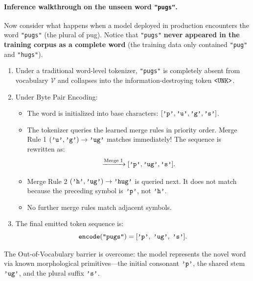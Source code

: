 \documentclass[../../main.tex]{subfiles}
\begin{document}
\paragraph{Inference walkthrough on the unseen word \texttt{"pugs"}.}
Now consider what happens when a model deployed in production encounters the word \texttt{"pugs"} (the plural of pug).
Notice that \texttt{"pugs"} \textbf{never appeared in the training corpus as a complete word} (the training data only contained \texttt{"pug"} and \texttt{"hugs"}).
\begin{enumerate}
    \item Under a traditional word-level tokenizer, \texttt{"pugs"} is completely absent from vocabulary $\mathcal{V}$ and collapses into the information-destroying token $\text{\texttt{<UNK>}}$.
    \item Under Byte Pair Encoding:
    \begin{itemize}
        \item The word is initialized into base characters: $[\text{\texttt{'p'}}, \text{\texttt{'u'}}, \text{\texttt{'g'}}, \text{\texttt{'s'}}]$.
        \item The tokenizer queries the learned merge rules in priority order. Merge Rule 1 $(\text{\texttt{'u'}}, \text{\texttt{'g'}}) \to \text{\texttt{'ug'}}$ matches immediately! The sequence is rewritten as:
        \begin{equation*}
        [\text{\texttt{'p'}}, \text{\texttt{'u'}}, \text{\texttt{'g'}}, \text{\texttt{'s'}}] \xrightarrow{\text{Merge 1}} [\text{\texttt{'p'}}, \text{\texttt{'ug'}}, \text{\texttt{'s'}}].
        \end{equation*}
        \item Merge Rule 2 $(\text{\texttt{'h'}}, \text{\texttt{'ug'}}) \to \text{\texttt{'hug'}}$ is queried next. It does not match because the preceding symbol is $\text{\texttt{'p'}}$, not $\text{\texttt{'h'}}$.
        \item No further merge rules match adjacent symbols.
    \end{itemize}
    \item The final emitted token sequence is:
    \begin{equation}
    \label{eq:bpe_unseen_result}
    \text{\texttt{encode}}(\text{\texttt{"pugs"}}) = [\text{\texttt{'p'}}, \; \text{\texttt{'ug'}}, \; \text{\texttt{'s'}}].
    \end{equation}
\end{enumerate}
The Out-of-Vocabulary barrier is overcome: the model represents the novel word via known morphological primitives---the initial consonant $\text{\texttt{'p'}}$, the shared stem $\text{\texttt{'ug'}}$, and the plural suffix $\text{\texttt{'s'}}$.
\end{document}
